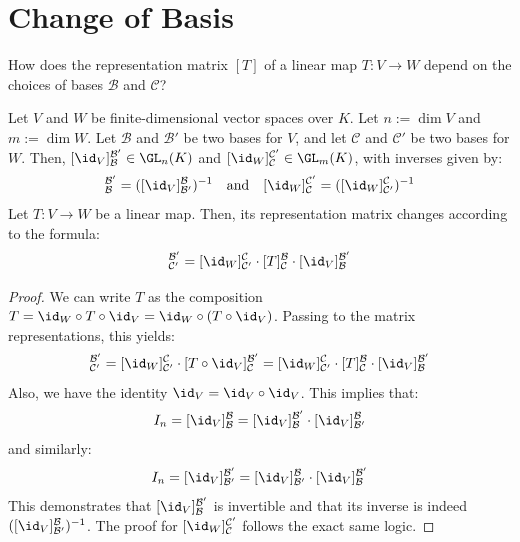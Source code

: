 \section{Change of Basis}

\begin{question}
How does the representation matrix $[T]$ of a linear map $T: V \to W$ depend on the choices of bases $\mathcal{B}$ and $\mathcal{C}$?
\end{question}

\begin{corollary}
\label{cor:change_of_basis_formula}
Let $V$ and $W$ be finite-di\-men\-sional vector spaces over $K$. Let $n := \dim V$ and $m := \dim W$. Let $\mathcal{B}$ and $\mathcal{B}'$ be two bases for $V$, and let $\mathcal{C}$ and $\mathcal{C}'$ be two bases for $W$. Then, $[\id_V]_{\mathcal{B}}^{\mathcal{B}'} \in \GL_n(K)$ and $[\id_W]_{\mathcal{C}}^{\mathcal{C}'} \in \GL_m(K)$, with inverses given by:
\begin{equation*}
    [\id_V]_{\mathcal{B}}^{\mathcal{B}'} = ([\id_V]_{\mathcal{B}'}^{\mathcal{B}})^{-1} \quad \text{and} \quad [\id_W]_{\mathcal{C}}^{\mathcal{C}'} = ([\id_W]_{\mathcal{C}'}^{\mathcal{C}})^{-1}
\end{equation*}
Let $T: V \to W$ be a linear map. Then, its representation matrix changes according to the formula:
\begin{equation*}
    [T]_{\mathcal{C}'}^{\mathcal{B}'} = [\id_W]_{\mathcal{C}'}^{\mathcal{C}} \cdot [T]_{\mathcal{C}}^{\mathcal{B}} \cdot [\id_V]_{\mathcal{B}}^{\mathcal{B}'}
\end{equation*}
\end{corollary}

\begin{proof}
We can write $T$ as the composition $T = \id_W \circ T \circ \id_V = \id_W \circ (T \circ \id_V)$. Passing to the matrix representations, this yields:
\begin{equation*}
    [T]_{\mathcal{C}'}^{\mathcal{B}'} = [\id_W]_{\mathcal{C}'}^{\mathcal{C}} \cdot [T \circ \id_V]_{\mathcal{C}}^{\mathcal{B}'} = [\id_W]_{\mathcal{C}'}^{\mathcal{C}} \cdot [T]_{\mathcal{C}}^{\mathcal{B}} \cdot [\id_V]_{\mathcal{B}}^{\mathcal{B}'}
\end{equation*}
Also, we have the identity $\id_V = \id_V \circ \id_V$. This implies that:
\begin{equation*}
    I_n = [\id_V]_{\mathcal{B}}^{\mathcal{B}} = [\id_V]_{\mathcal{B}}^{\mathcal{B}'} \cdot [\id_V]_{\mathcal{B}'}^{\mathcal{B}}
\end{equation*}
and similarly:
\begin{equation*}
    I_n = [\id_V]_{\mathcal{B}'}^{\mathcal{B}'} = [\id_V]_{\mathcal{B}'}^{\mathcal{B}} \cdot [\id_V]_{\mathcal{B}}^{\mathcal{B}'}
\end{equation*}
This demonstrates that $[\id_V]_{\mathcal{B}}^{\mathcal{B}'}$ is invertible and that its inverse is indeed $([\id_V]_{\mathcal{B}'}^{\mathcal{B}})^{-1}$. The proof for $[\id_W]_{\mathcal{C}}^{\mathcal{C}'}$ follows the exact same logic.
\end{proof}

